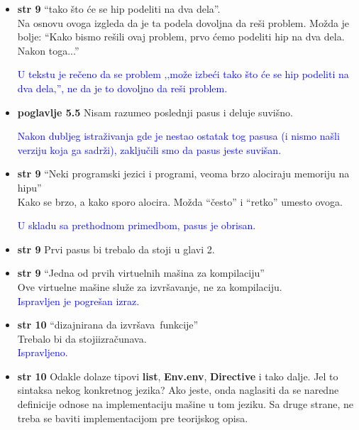 \documentclass[a4paper]{report}
\newcommand{\odgovor}[1]{\textcolor{blue}{#1}}
\begin{document}
\begin{itemize}
\item \textbf{str 9} ``tako što će se hip podeliti na dva dela''. \\ Na osnovu ovoga izgleda da je ta podela dovoljna da reši problem. Možda je bolje: ``Kako bismo rešili ovaj problem, prvo ćemo podeliti hip na dva dela. Nakon toga...''

\odgovor{U tekstu je rečeno da se problem ‚‚može izbeći tako što će se hip podeliti na dva dela‚'', ne da je to dovoljno da reši problem.}

\item \textbf{poglavlje 5.5} Nisam razumeo poslednji pasus i deluje suvišno.

\odgovor{Nakon dubljeg istraživanja gde je nestao ostatak tog pasusa (i nismo našli verziju koja ga sadrži), zaključili smo da pasus jeste suvišan.}

\item \textbf{str 9} ``Neki programski jezici i programi, veoma brzo alociraju memoriju na hipu'' \\ Kako se brzo, a kako sporo alocira. Možda ``često'' i ``retko'' umesto ovoga.

\odgovor{U skladu sa prethodnom primedbom, pasus je obrisan.}

\item \textbf{str 9} Prvi pasus bi trebalo da stoji u glavi 2.\\

\item \textbf{str 9} ``Jedna od prvih virtuelnih mašina za kompilaciju'' \\ Ove virtuelne mašine služe za izvršavanje, ne za kompilaciju.\\

\odgovor{Ispravljen je pogrešan izraz.}

\item \textbf{str 10} ``dizajnirana da \color{blue}izvršava\color{black}~funkcije'' \\ Trebalo bi da stoji\color{blue}izračunava\color{black}.\\

\odgovor{Ispravljeno.}

\item \textbf{str 10} Odakle dolaze tipovi \textbf{list}, \textbf{Env.env}, \textbf{Directive} i tako dalje. Jel to sintaksa nekog konkretnog jezika? Ako jeste, onda naglasiti da se naredne definicije odnose na implementaciju mašine u tom jeziku. Sa druge strane, ne treba se baviti implementacijom pre teorijskog opisa.\\


\end{itemize}
\end{document}
